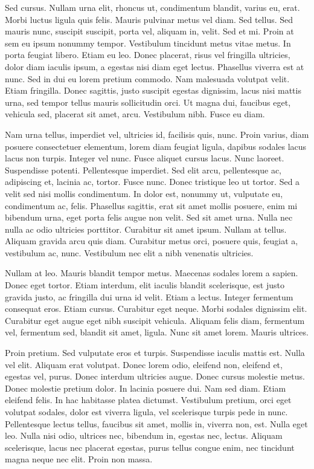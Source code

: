 \documentclass{book}
\begin{document}
Sed cursus. Nullam urna elit, rhoncus ut, condimentum blandit, varius eu, erat. Morbi luctus ligula quis felis. Mauris pulvinar metus vel diam. Sed tellus. Sed mauris nunc, suscipit suscipit, porta vel, aliquam in, velit. Sed et mi. Proin at sem eu ipsum nonummy tempor. Vestibulum tincidunt metus vitae metus. In porta feugiat libero. Etiam eu leo. Donec placerat, risus vel fringilla ultricies, dolor diam iaculis ipsum, a egestas nisi diam eget lectus. Phasellus viverra est at nunc. Sed in dui eu lorem pretium commodo. Nam malesuada volutpat velit. Etiam fringilla. Donec sagittis, justo suscipit egestas dignissim, lacus nisi mattis urna, sed tempor tellus mauris sollicitudin orci. Ut magna dui, faucibus eget, vehicula sed, placerat sit amet, arcu. Vestibulum nibh. Fusce eu diam.

Nam urna tellus, imperdiet vel, ultricies id, facilisis quis, nunc. Proin varius, diam posuere consectetuer elementum, lorem diam feugiat ligula, dapibus sodales lacus lacus non turpis. Integer vel nunc. Fusce aliquet cursus lacus. Nunc laoreet. Suspendisse potenti. Pellentesque imperdiet. Sed elit arcu, pellentesque ac, adipiscing et, lacinia ac, tortor. Fusce nunc. Donec tristique leo ut tortor. Sed a velit sed nisi mollis condimentum. In dolor est, nonummy ut, vulputate eu, condimentum ac, felis. Phasellus sagittis, erat sit amet mollis posuere, enim mi bibendum urna, eget porta felis augue non velit. Sed sit amet urna. Nulla nec nulla ac odio ultricies porttitor. Curabitur sit amet ipsum. Nullam at tellus. Aliquam gravida arcu quis diam. Curabitur metus orci, posuere quis, feugiat a, vestibulum ac, nunc. Vestibulum nec elit a nibh venenatis ultricies.

Nullam at leo. Mauris blandit tempor metus. Maecenas sodales lorem a sapien. Donec eget tortor. Etiam interdum, elit iaculis blandit scelerisque, est justo gravida justo, ac fringilla dui urna id velit. Etiam a lectus. Integer fermentum consequat eros. Etiam cursus. Curabitur eget neque. Morbi sodales dignissim elit. Curabitur eget augue eget nibh suscipit vehicula. Aliquam felis diam, fermentum vel, fermentum sed, blandit sit amet, ligula. Nunc sit amet lorem. Mauris ultrices.

Proin pretium. Sed vulputate eros et turpis. Suspendisse iaculis mattis est. Nulla vel elit. Aliquam erat volutpat. Donec lorem odio, eleifend non, eleifend et, egestas vel, purus. Donec interdum ultricies augue. Donec cursus molestie metus. Donec molestie pretium dolor. In lacinia posuere dui. Nam sed diam. Etiam eleifend felis. In hac habitasse platea dictumst. Vestibulum pretium, orci eget volutpat sodales, dolor est viverra ligula, vel scelerisque turpis pede in nunc. Pellentesque lectus tellus, faucibus sit amet, mollis in, viverra non, est. Nulla eget leo. Nulla nisi odio, ultrices nec, bibendum in, egestas nec, lectus. Aliquam scelerisque, lacus nec placerat egestas, purus tellus congue enim, nec tincidunt magna neque nec elit. Proin non massa.
\end{document}
